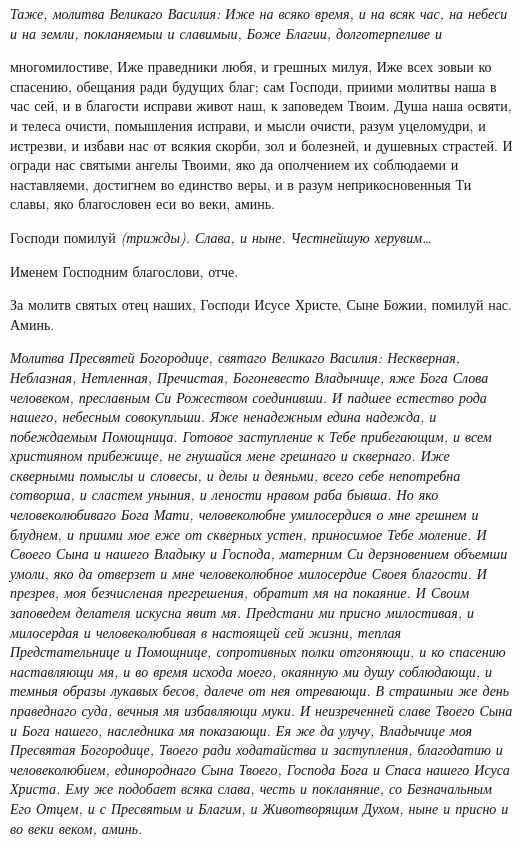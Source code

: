  \itshape Таже, молитва Великаго Василия:\normalfont{} Иже на всяко время, и на всяк час, на
небеси и на земли, покланяемыи и славимыи, Боже Благии, долготерпеливе и

многомилостиве, Иже праведники любя, и грешных милуя, Иже всех зовыи
ко спасению, обещания ради будущих благ; сам Господи, приими молитвы
наша в час сей, и в благости исправи живот наш, к заповедем Твоим. Душа
наша освяти, и телеса очисти, помышления исправи, и мысли очисти, разум
уцеломудри, и истрезви, и избави нас от всякия скорби, зол и болезней, и
душевных страстей. И огради нас святыми ангелы Твоими, яко да
ополчением их соблюдаеми и наставляеми, достигнем во единство веры, и в
разум неприкосновенныя Ти славы, яко благословен еси во веки,
аминь.


   Господи помилуй \itshape (трижды)\normalfont{}. \itshape Слава, и ныне\normalfont{}. Честнейшую херувим…


   Именем Господним благослови, отче.


   За молитв святых отец наших, Господи Исусе Христе, Сыне Божии,
помилуй нас. Аминь.


 \itshape Молитва Пресвятей Богородице, святаго Великаго Василия:\normalfont{} Нескверная,
Неблазная, Нетленная, Пречистая, Богоневесто Владычице, яже Бога Слова
человеком, преславным Си Рожеством соединивши. И падшее естество рода
нашего, небесным совокупльши. Яже ненадежным едина надежда, и
побеждаемым Помощница. Готовое заступление к Тебе прибегающим, и всем
християном прибежище, не гнушайся мене грешнаго и сквернаго. Иже
скверными помыслы и словесы, и делы и деяньми, всего себе непотребна
сотворша, и сластем уныния, и лености нравом раба бывша. Но яко
человеколюбиваго Бога Мати, человеколюбне умилосердися о мне грешнем и
блуднем, и приими мое еже от скверных устен, приносимое Тебе моление. И
Своего Сына и нашего Владыку и Господа, матерним Си дерзновением
объемши умоли, яко да отверзет и мне человеколюбное милосердие Своея
благости. И презрев, моя безчисленая прегрешения, обратит мя на
покаяние. И Своим заповедем делателя искусна явит мя. Предстани ми
присно милостивая, и милосердая и человеколюбивая в настоящей сей
жизни, теплая Предстательнице и Помощнице, сопротивных полки
отгоняющи, и ко спасению наставляющи мя, и во время исхода моего,
окаянную ми душу соблюдающи, и темныя образы лукавых бесов,
далече от нея отревающи. В страшныи же день праведнаго суда,
вечныя мя избавляющи муки. И неизреченней славе Твоего Сына и
Бога нашего, наследника мя показающи. Ея же да улучу, Владычице
моя Пресвятая Богородице, Твоего ради ходатайства и заступления,
благодатию и человеколюбием, единороднаго Сына Твоего, Господа
Бога и Спаса нашего Исуса Христа. Ему же подобает всяка слава,
честь и покланяние, со Безначальным Его Отцем, и с Пресвятым и
Благим, и Животворящим Духом, ныне и присно и во веки веком,
аминь.



